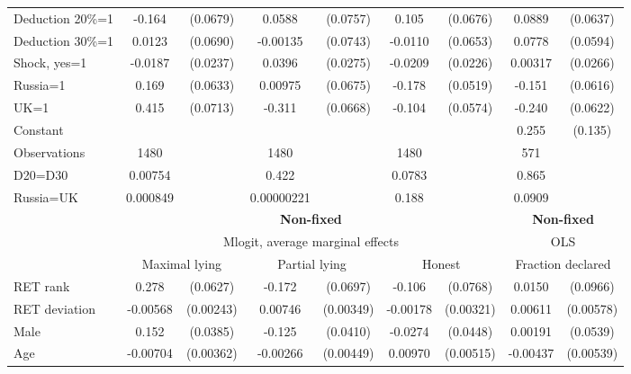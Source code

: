 \begin{tabular}{l|cccccc|cc}
Deduction 20\%=1&   -0.164\sym{**} & (0.0679)&   0.0588         & (0.0757)&    0.105         & (0.0676)&   0.0889         & (0.0637)\\
Deduction 30\%=1&   0.0123         & (0.0690)& -0.00135         & (0.0743)&  -0.0110         & (0.0653)&   0.0778         & (0.0594)\\
Shock, yes=1    &  -0.0187         & (0.0237)&   0.0396         & (0.0275)&  -0.0209         & (0.0226)&  0.00317         & (0.0266)\\
Russia=1        &    0.169\sym{***}& (0.0633)&  0.00975         & (0.0675)&   -0.178\sym{***}& (0.0519)&   -0.151\sym{**} & (0.0616)\\
UK=1            &    0.415\sym{***}& (0.0713)&   -0.311\sym{***}& (0.0668)&   -0.104\sym{*}  & (0.0574)&   -0.240\sym{***}& (0.0622)\\
Constant        &                  &         &                  &         &                  &         &    0.255\sym{*}  &  (0.135)\\
\hline
Observations    &     1480         &         &     1480         &         &     1480         &         &      571         &         \\
D20=D30         &  0.00754         &         &    0.422         &         &   0.0783         &         &    0.865         &         \\
Russia=UK       & 0.000849         &         &0.00000221         &         &    0.188         &         &   0.0909         &         \\
\hline\hline
&\multicolumn{6}{c|}{\bf Non-fixed}&\multicolumn{2}{c}{\bf Non-fixed}\\ &\multicolumn{6}{c|}{Mlogit, average marginal effects }&\multicolumn{2}{c}{OLS}\\
                &\multicolumn{2}{c}{Maximal lying}&\multicolumn{2}{c}{Partial lying}&\multicolumn{2}{c}{Honest}  &\multicolumn{2}{c}{Fraction declared}\\
\hline
RET rank        &    0.278\sym{***}& (0.0627)&   -0.172\sym{**} & (0.0697)&   -0.106         & (0.0768)&   0.0150         & (0.0966)\\
RET deviation   & -0.00568\sym{**} &(0.00243)&  0.00746\sym{**} &(0.00349)& -0.00178         &(0.00321)&  0.00611         &(0.00578)\\
Male            &    0.152\sym{***}& (0.0385)&   -0.125\sym{***}& (0.0410)&  -0.0274         & (0.0448)&  0.00191         & (0.0539)\\
Age             & -0.00704\sym{*}  &(0.00362)& -0.00266         &(0.00449)&  0.00970\sym{*}  &(0.00515)& -0.00437         &(0.00539)\\

\end{tabular}

